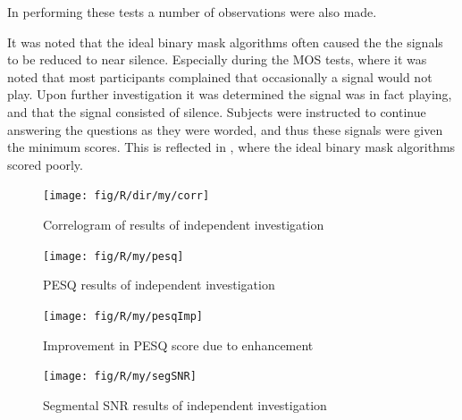 In performing these tests a number of observations were also made.

It was noted that the ideal binary mask algorithms often caused the
the signals to be reduced to near silence. Especially during the \ac{MOS}
tests, where it was noted that most participants complained that occasionally
a signal would not play. Upon further investigation it was determined
the signal was in fact playing, and that the signal consisted of silence.
Subjects were instructed to continue answering the questions as they
were worded, and thus these signals were given the minimum scores.
This is reflected in ,
where the ideal binary mask algorithms scored poorly.

\begin{figure}[h]
\noindent \begin{centering}
\texttt{[image: fig/R/dir/my/corr]}
\par\end{centering}

\protect\caption{\label{fig:my-Corr}Correlogram of results of independent investigation}
\end{figure}


\begin{figure}[p]
\noindent \begin{centering}
\texttt{[image: fig/R/my/pesq]}
\par\end{centering}

\protect\caption{\label{fig:my-PESQ}\acs{PESQ} results of independent investigation}
\end{figure}


\begin{figure}[p]
\noindent \begin{centering}
\texttt{[image: fig/R/my/pesqImp]}
\par\end{centering}

\protect\caption{\label{fig:my-PESQ-imp}Improvement in \acs{PESQ} score due to enhancement}
\end{figure}


\begin{figure}[h]
\noindent \begin{centering}
\texttt{[image: fig/R/my/segSNR]}
\par\end{centering}

\protect\caption{\label{fig:my-segSNR}Segmental \acs{SNR} results of independent
investigation}
\end{figure}



